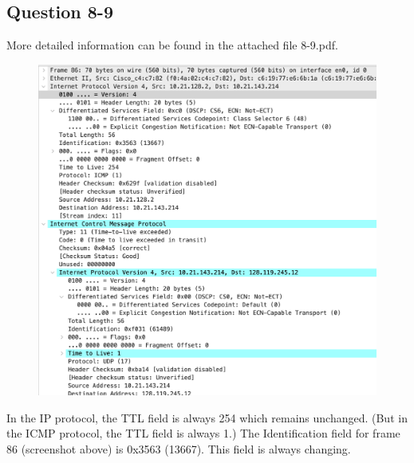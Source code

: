 \documentclass{article}
\begin{document}
\begin{CJK*}{UTF8}{gbsn}
\subsection{Question 8-9}
More detailed information can be found in the attached file 8-9.pdf.
\begin{figure}[H]
    \centering
    \includegraphics[width=1.0\textwidth]{9.png}
\end{figure}
In the IP protocol, the TTL field is always 254 which remains unchanged.
(But in the ICMP protocol, the TTL field is always 1.) The Identification field for frame 86 (screenshot above) is 0x3563 (13667).
This field is always changing.


\end{CJK*}
\end{document}
